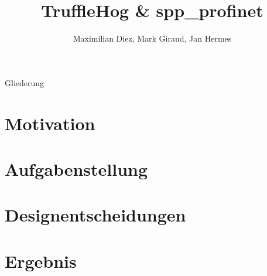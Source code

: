 \documentclass[18pt]{beamer}
\title[TruffleHog \& spp\_profinet]{TruffleHog \& spp\_profinet}
\author{Maximilian Diez, Mark Giraud, Jan Hermes}
\institute{Fraunhofer IOSB}
\begin{document}

\begin{frame}
\titlepage
\end{frame}

\begin{frame}{Gliederung}
\tableofcontents
\end{frame}

\section{Motivation}
    
\section{Aufgabenstellung}
    
\section{Designentscheidungen}
    
\section{Ergebnis}
    
\end{document}
